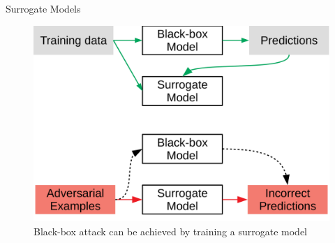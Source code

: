 \documentclass[9pt]{beamer}
\begin{document}
\begin{frame}{Surrogate Models}
\begin{figure}
    \centering
    \small
    \includegraphics[width=0.8\linewidth]{images/Surrogate model.pdf}
    \caption{Black-box attack can be achieved by training a surrogate model}
    \label{fig:surrogate}
\end{figure}
\end{frame}
\end{document}
